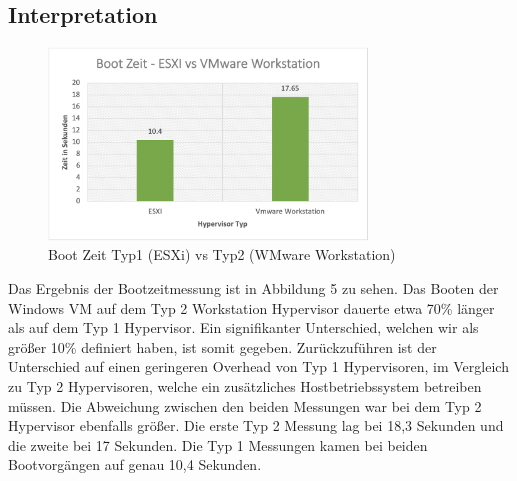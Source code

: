 \documentclass[conference]{IEEEtran}
\begin{document}
\subsection{Interpretation}
\begin{figure}[!h]
	\centering
	\includegraphics[keepaspectratio,width=8.5cm,height=0.75\textheight]{bootzeit.png}
	\caption{Boot Zeit Typ1 (ESXi) vs Typ2 (WMware Workstation)}
	\label{boottime}
\end{figure}

Das Ergebnis der Bootzeitmessung ist in Abbildung 5 zu sehen. Das Booten der Windows VM auf dem Typ 2 Workstation Hypervisor dauerte etwa 70\% länger als auf dem Typ 1 Hypervisor. Ein signifikanter Unterschied, welchen wir als größer 10\% definiert haben, ist somit gegeben. Zurückzuführen ist der Unterschied auf einen geringeren Overhead von Typ 1 Hypervisoren, im Vergleich zu Typ 2 Hypervisoren, welche ein zusätzliches Hostbetriebssystem betreiben müssen. Die Abweichung zwischen den beiden Messungen war bei dem Typ 2 Hypervisor ebenfalls größer. Die erste Typ 2 Messung lag bei 18,3 Sekunden und die zweite bei 17 Sekunden. Die Typ 1 Messungen kamen bei beiden Bootvorgängen auf genau 10,4 Sekunden.
\end{document}
